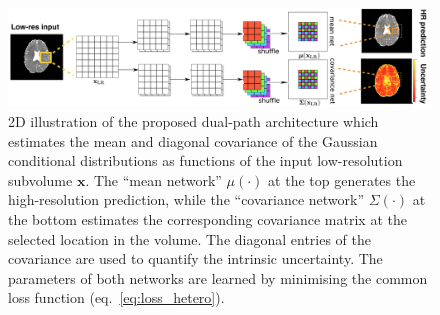 \begin{figure}
	\includegraphics[width=\linewidth]{chapter_3/figures/fig_2_3.png}
	\centering	
	\caption{\footnotesize 2D illustration of the proposed dual-path architecture which estimates the mean and diagonal covariance of the Gaussian conditional distributions as functions of the input low-resolution subvolume $\mathbf{x}$.  The ``mean network'' $\mu(\cdot)$ at the top generates the high-resolution prediction, while the ``covariance network''  $\Sigma(\cdot)$ at the bottom estimates the corresponding covariance matrix at the selected location in the volume. The diagonal entries of the covariance are used to quantify the intrinsic uncertainty. The parameters of both networks are learned by minimising the common loss function (eq.~\eqref{eq:loss_hetero}).} 
	\label{fig:hetero}
\end{figure}

